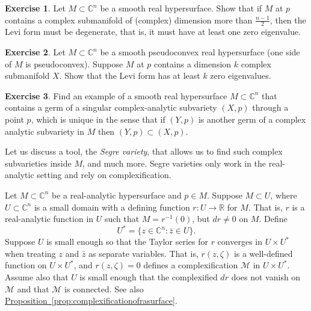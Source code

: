 \documentclass[12pt,openany]{book}
\newcommand{\C}{{\mathbb{C}}}
\newcommand{\R}{{\mathbb{R}}}
\newcommand{\sM}{{\mathscr{M}}}
\newcommand{\myindex}[1]{#1\index{#1}}
\theoremstyle{plain}
\theoremstyle{remark}
\theoremstyle{definition}
\newenvironment{exbox}{%
    \def\FrameCommand{\vrule width 1pt \relax\hspace{10pt}}%
    \MakeFramed {\advance \hsize -\width \FrameRestore}%
}{%
    \endMakeFramed
}
\theoremstyle{exercise}
\newtheorem{exercise}{Exercise}[section]
\theoremstyle{example}
\newcommand{\propref}[1]{\hyperref[#1]{Proposition~\ref*{#1}}}
\begin{document}
\begin{exbox}
\begin{exercise}
Let $M \subset \C^n$ be a smooth real hypersurface.
Show that if $M$ at $p$ contains a complex submanifold of (complex)
dimension more than
$\frac{n-1}{2}$, then the Levi form must be degenerate, that is, it must
have at least one zero eigenvalue.
\end{exercise}

\begin{exercise}
Let $M \subset \C^n$ be a smooth pseudoconvex real hypersurface
(one side of $M$ is pseudoconvex).
Suppose $M$ at $p$ contains a dimension $k$ complex submanifold $X$.
Show that the Levi form has at least $k$ zero eigenvalues.
\end{exercise}

\begin{exercise}
Find an example of a smooth real hypersurface $M \subset \C^n$ that contains a
germ of a singular complex-analytic subvariety $(X,p)$ through a point $p$,
which is unique in the sense that if $(Y,p)$ is another germ of a complex
analytic subvariety in $M$ then $(Y,p) \subset (X,p)$.
\end{exercise}
\end{exbox}

Let us discuss a tool, the \emph{\myindex{Segre variety}}, that allows us to
find such complex subvarieties inside $M$, and much more.  Segre varieties only
work in the real-analytic setting and rely on complexification.

Let $M \subset \C^n$ be a real-analytic hypersurface and $p \in M$.
Suppose $M \subset U$,
where $U \subset \C^n$ is a small domain with a defining function $r \colon
U  \to \R$ for $M$.  That is, $r$ is a real-analytic function in $U$ such that
$M = r^{-1}(0)$, but
$dr \not= 0$ on $M$.  Define
%
\begin{equation*}
U^* = \bigl\{ z \in \C^n : \bar{z} \in U \bigr\} .
\end{equation*}
Suppose $U$ is small enough so that the Taylor series for $r$
converges in $U \times U^*$ when treating $z$ and $\bar{z}$ as separate
variables.  That is, $r(z,\zeta)$ is a well-defined function on
$U \times U^*$, and $r(z,\zeta) = 0$ defines a complexification $\sM$
in $U \times U^*$.  Assume also that $U$ is small enough that
the complexified
$dr$ does not vanish on $\sM$ and that $\sM$ is connected.
See also \propref{prop:complexificationofrasurface}.
\end{document}
